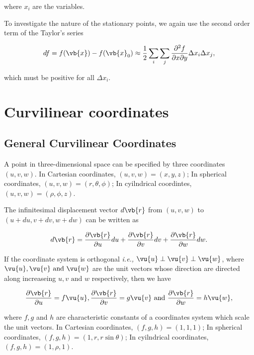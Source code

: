 \documentclass[english,a4paper,12pt]{report}
\begin{document}
where \(x_{i} \) are the variables. 

To investigate the nature of the stationary points, we again use the second order term of the Taylor's series

\begin{equation}
    df = f(\vb{x} ) - f(\vb{x} _{0} ) \approx \frac{1}{2}\sum_{i} \sum_{j} \frac{\partial^2 f}{\partial x \partial y} \Delta x_{i}\Delta x_{j},      
\end{equation}

which must be positive for all \(\Delta x_{i} \).

\section{Curvilinear coordinates}

\subsection{General Curvilinear Coordinates}

A point in three-dimensional space can be specified by three coordinates \((u,v,w)\). In Cartesian coordinates, \((u,v,w) = (x,y,z)\); In spherical coordinates, \((u,v,w) = (r, \theta, \phi)\); In cyilndrical coordintes, \((u,v,w) = (\rho, \phi, z)\). 

The infinitesimal displacement vector \(d \vb{r} \)  from \((u,v,w)\) to \((u+du, v+dv, w+dw)\) can be written as

\begin{equation} 
	d\vb{r} = \frac{\partial \vb{r} }{\partial u} du + \frac{\partial \vb{r} }{\partial v}dv + \frac{\partial \vb{r} }{\partial w}dw. 
\end{equation}

If the coordinate system is orthogonal \textit{i.e.,} \(\vu{u} \perp \vu{v} \perp \vu{w}\), where \(\vu{u} ,\vu{v} \text { and } \vu{w} \) are the unit vectors whose direction are directed along increaseing \(u, v \text { and } w\) respectively, then we have

\begin{equation}
    \frac{\partial \vb{r} }{\partial u} = f \vu{u}, \frac{\partial \vb{r} }{\partial v} = g \vu{v}  \text { and } \frac{\partial \vb{r} }{\partial w} = h \vu{w}  ,
\end{equation}

where \(f,g\) and \(h\) are characteristic constants of a coordinates system which scale the unit vectors. In Cartesian coordinates, \((f,g,h) = (1,1,1)\); In spherical coordinates, \((f,g,h) = (1,r,r\sin{\theta})\); In cyilndrical coordinates, \((f,g,h) = (1,\rho ,1)\).
	
\end{document}
